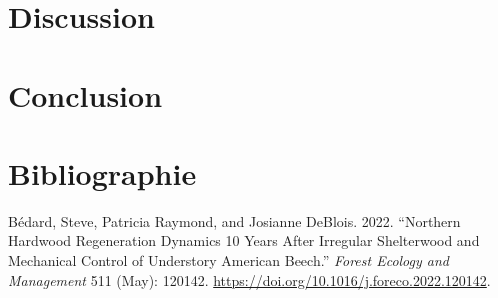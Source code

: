 \documentclass[
  12pt,
]{article}
\newlength{\cslhangindent}
\newenvironment{CSLReferences}[2] %
 {\begin{list}{}{%
  \setlength{\itemindent}{0pt}
  \setlength{\leftmargin}{0pt}
  \setlength{\parsep}{0pt}
  \ifodd #1
   \setlength{\leftmargin}{\cslhangindent}
   \setlength{\itemindent}{-1\cslhangindent}
  \fi
  \setlength{\itemsep}{#2\baselineskip}}}
 {\end{list}}
\begin{document}
\section{Discussion}\label{discussion}

\section{Conclusion}\label{conclusion}

\newpage{}

\section*{Bibliographie}\label{bibliographie}

\label{refs}
\begin{CSLReferences}{1}{0}
Bédard, Steve, Patricia Raymond, and Josianne DeBlois. 2022. {``Northern
Hardwood Regeneration Dynamics 10 Years After Irregular Shelterwood and
Mechanical Control of Understory American Beech.''} \emph{Forest Ecology
and Management} 511 (May): 120142.
\url{https://doi.org/10.1016/j.foreco.2022.120142}.

\end{CSLReferences}
\end{document}
